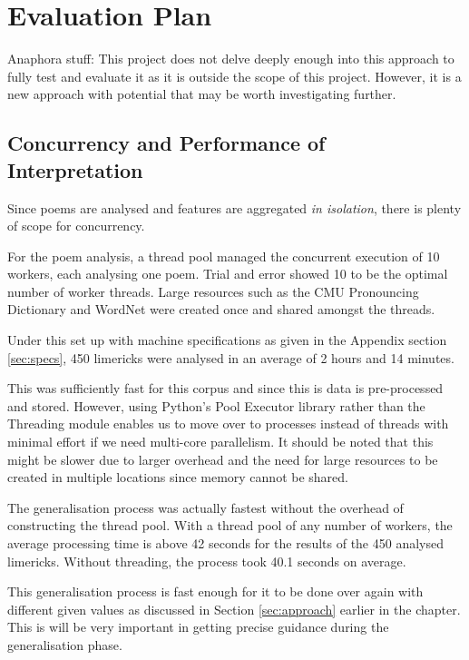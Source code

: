 \chapter{Evaluation Plan}
\ifpdf
    \graphicspath{{Evaluation/EvaluationFigs/PNG/}{Evaluation/EvaluationFigs/PDF/}{Evaluation/EvaluationFigs/}}
\else
    \graphicspath{{Evaluation/EvaluationFigs/EPS/}{Evaluation/EvaluationFigs/}}
\fi
Anaphora stuff:
This project does not delve deeply enough into this approach to fully test and evaluate it as it is outside the scope of this project. However, it is a new approach with potential that may be worth investigating further.

\section{Concurrency and Performance of Interpretation}
\label{sec:interpret-perf}

Since poems are analysed and features are aggregated \textit{in isolation}, there is plenty of scope for concurrency.

For the poem analysis, a thread pool managed the concurrent execution of 10 workers, each analysing one poem. Trial and error showed 10 to be the optimal number of worker threads. Large resources such as the CMU Pronouncing Dictionary and WordNet were created once and shared amongst the threads.

Under this set up with machine specifications as given in the Appendix section \ref{sec:specs}, 450 limericks were analysed in an average of 2 hours and 14 minutes.

This was sufficiently fast for this corpus and since this is data is pre-processed and stored. However, using Python's Pool Executor library rather than the Threading module enables us to move over to processes instead of threads with minimal effort if we need multi-core parallelism. It should be noted that this might be slower due to larger overhead and the need for large resources to be created in multiple locations since memory cannot be shared.

The generalisation process was actually fastest without the overhead of constructing the thread pool. With a thread pool of any number of workers, the average processing time is above 42 seconds for the results of the 450 analysed limericks. Without threading, the process took 40.1 seconds on average.

This generalisation process is fast enough for it to be done over again with different given values as discussed in Section \ref{sec:approach} earlier in the chapter. This is will be very important in getting precise guidance during the generalisation phase. 

